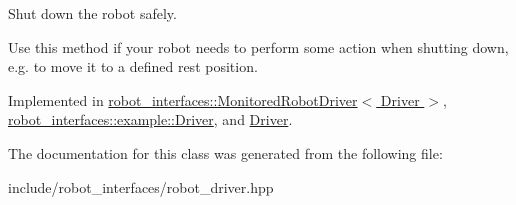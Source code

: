 Shut down the robot safely. 

Use this method if your robot needs to perform some action when shutting down, e.\+g. to move it to a defined rest position. 

Implemented in \hyperlink{classrobot__interfaces_1_1MonitoredRobotDriver_a95714a60e69a3ac06461382a7b391289}{robot\+\_\+interfaces\+::\+Monitored\+Robot\+Driver$<$ Driver $>$}, \hyperlink{classrobot__interfaces_1_1example_1_1Driver_a91cbe74896c9ed56ff7eee6380964dfe}{robot\+\_\+interfaces\+::example\+::\+Driver}, and \hyperlink{classDriver_a630fc9183eb419beb09b5828b4547b6d}{Driver}.



The documentation for this class was generated from the following file\+:\begin{DoxyCompactItemize}
\item 
include/robot\+\_\+interfaces/robot\+\_\+driver.\+hpp\end{DoxyCompactItemize}
